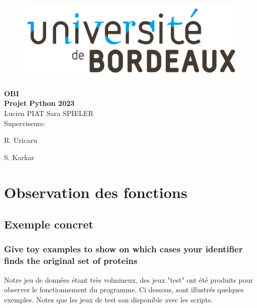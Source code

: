 \documentclass[titlepage]{report}
\begin{document}
\begin{center}
\begin{figure}[htbp]
\centering
\includegraphics[width=0.5\columnwidth]{Logo.svg.png}
\end{figure}
\vspace{0.5cm}
\vspace{1.5cm}
\Huge{\bfseries OBI} \\
\vspace{3cm}
\Huge{\bfseries Projet Python 2023} \\
\vspace{3cm}
\huge{Lucien PIAT} 
\huge{Sara SPIELER} \\
\vspace{3cm}    
\Large Superviseurs:\\
\vspace{0.5cm}
\begin{minipage}{0.30\textwidth}
\centering
\Large{R. Uricaru}
\end{minipage}
\begin{minipage}{0.30\textwidth}
\centering
\Large{S. Karkar}
\end{minipage} 
\end{center}
\thispagestyle{empty} 
\newpage
\clearpage
{} 

\section{Observation des fonctions}
\subsection{Exemple concret}
\subsubsection{Give toy examples to show on which cases your identifier finds the original set of proteins}
\hspace*{1cm} Notre jeu de données étant très volmineux, des jeux "test" ont été produits pour observer le fonctionnement du programme. Ci dessous, sont illustrés quelques exemples. Notez que les jeux de test son disponible avec les scripts.
\end{document}
